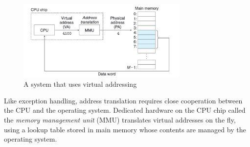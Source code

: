 \documentclass[../ch4.tex, ../../main.tex]{subfiles}
\begin{document}
        \begin{figure}[H]
            \centering
            \includegraphics[width=0.75\textwidth]{graphics/Figure 4.2.png}
            \caption{A system that uses virtual addressing}
            \label{fig:42}
        \end{figure}

        Like exception handling, address translation requires close cooperation between the CPU and the operating system. Dedicated hardware on the CPU chip called the \textit{memory management unit} (MMU) translates virtual addresses on the fly, using a lookup table stored in main memory whose contents are managed by the operating system.
\end{document}
